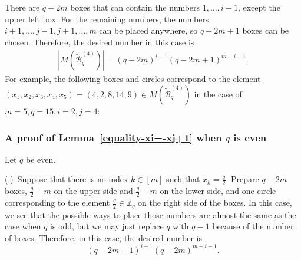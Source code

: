 \documentclass{article}
\theoremstyle{plain}
\theoremstyle{definition}
\theoremstyle{remark}
\numberwithin{equation}{section}
\newcommand{\Bc}{\mathcal{B}}
\newcommand{\ZZ}{\mathbb{Z}}
\begin{document}
There are $q-2m$ boxes that can contain the numbers $1,\dots,i-1$, except the upper left box.
For the remaining numbers, the numbers $i+1,\dots,j-1, j+1,\dots,m$ can be placed anywhere, so $q-2m+1$ boxes can be chosen.
Therefore, the desired number in this case is 
\begin{align*}
    \left|M(\mathcal{\widetilde{B}}^{(4)}_q)\right| = (q-2m)^{i-1}(q-2m+1)^{m-i-1}. 
\end{align*}
For example, the following boxes and circles correspond to the element $(x_1,x_2,x_3,x_4,x_5)=(4,2,8,14,9)\in M(\widetilde{\Bc}^{(4)}_q)$ in the case of $m=5,q=15,i=2,j=4$:
\begin{center}
\end{center}


\subsubsection{A proof of Lemma~\ref{equality-xi=-xj+1} when $q$ is even}\label{sec-count-method-x_i+x_j=1-even}
Let $q$ be even.

(i)\ Suppose that there is no index $k\in[m]$ such that $\displaystyle x_k=\frac{q}{2}$.
Prepare $q-2m$ boxes, $\displaystyle \frac{q}{2}-m$ on the upper side and $\displaystyle \frac{q}{2}-m$ on the lower side, 
and one circle corresponding to the element $\displaystyle \frac{q}{2}\in\ZZ_q$ on the right side of the boxes. 
In this case, we see that the possible ways to place those numbers are almost the same as the case when $q$ is odd, but we may just replace $q$ with $q-1$ because of the number of boxes. 
Therefore, in this case, the desired number is 
\[
(q-2m-1)^{i-1}(q-2m)^{m-i-1}.
\]
\end{document}
